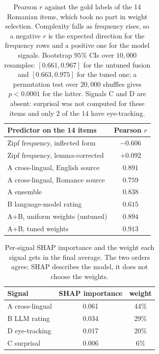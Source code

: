 \begin{table}[tbp]
\centering\small
\begin{tabular}{lc}
\toprule
\textbf{Predictor on the 14 items} & \textbf{Pearson $r$} \\
\midrule
Zipf frequency, inflected form & $-0.606$ \\
Zipf frequency, lemma-corrected & $+0.092$ \\
\midrule
A cross-lingual, English source & $0.891$ \\
A cross-lingual, Romance source & $0.759$ \\
A ensemble & $0.838$ \\
B language-model rating & $0.615$ \\
\midrule
A+B, uniform weights (untuned) & $0.894$ \\
A+B, tuned weights & $\mathbf{0.913}$ \\
\bottomrule
\end{tabular}
\caption{Pearson $r$ against the gold labels of the 14 Romanian items, which took no part in weight selection.
Complexity falls as frequency rises, so a negative $r$ is the expected direction for the frequency rows and a
positive one for the model signals. Bootstrap $95\%$ CIs over $10{,}000$ resamples: $[0.661, 0.967]$ for the
untuned fusion and $[0.663, 0.975]$ for the tuned one; a permutation test over $20{,}000$ shuffles gives
$p < 0.0001$ for the latter. Signals C and D are absent: surprisal was not computed for these items and only $2$
of the $14$ have eye-tracking.}
\label{tab:ro14}
\end{table}

\begin{table}[tbp]
\centering\small
\begin{tabular}{lcc}
\toprule
\textbf{Signal} & \textbf{SHAP importance} & \textbf{weight} \\
\midrule
A cross-lingual & 0.061 & 44\% \\
B LLM rating & 0.034 & 29\% \\
D eye-tracking & 0.017 & 20\% \\
C surprisal & 0.006 & 6\% \\
\bottomrule
\end{tabular}
\caption{Per-signal SHAP importance and the weight each signal gets in the final average. The two orders agree;
SHAP describes the model, it does not choose the weights.}
\label{tab:signals}
\end{table}

